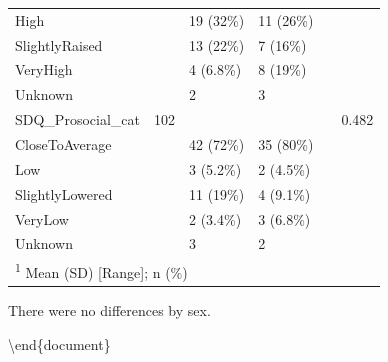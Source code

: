 \documentclass[
]{article}
\begin{document}
\begin{table}[!h]
\begin{tabular}[t]{llllll}
\hspace{1em}High &  & 19 (32\%) & 11 (26\%) &  & \\
\hspace{1em}SlightlyRaised &  & 13 (22\%) & 7 (16\%) &  & \\
\addlinespace
\hspace{1em}VeryHigh &  & 4 (6.8\%) & 8 (19\%) &  & \\
\hspace{1em}Unknown &  & 2 & 3 &  & \\
SDQ\_Prosocial\_cat & 102 &  &  &  & 0.482\\
\hspace{1em}CloseToAverage &  & 42 (72\%) & 35 (80\%) &  & \\
\hspace{1em}Low &  & 3 (5.2\%) & 2 (4.5\%) &  & \\
\addlinespace
\hspace{1em}SlightlyLowered &  & 11 (19\%) & 4 (9.1\%) &  & \\
\hspace{1em}VeryLow &  & 2 (3.4\%) & 3 (6.8\%) &  & \\
\hspace{1em}Unknown &  & 3 & 2 &  & \\
\bottomrule
\multicolumn{6}{l}{\rule{0pt}{1em}\textsuperscript{1} Mean (SD)   [Range]; n (\%)}\\
\end{tabular}
\end{table}

There were no differences by sex.

\FloatBarrier
\clearpage

\textbackslash end\{document\}
\end{document}
